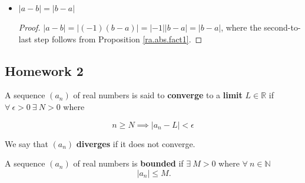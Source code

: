 \begin{itemize}
\begin{proof}
\begin{itemize}
\item \textbf{Case 1:} \(x \geq y\). Then \(|x - y| = x - y\). We know \(a < x < b \implies 0 < x - a < b - a\). 

\[
a < y \implies -a > -y \implies x - a > x -y \implies x - y < x - a < b - a
\]

\[
\implies \boxed{|x - y| < b - a}
\]


\item \textbf{Case 2:} \(x < y\). Then \(|x - y| = y - x\). We know \(a < y < b \implies 0 < y - a < b - a\).

\[
a < x \implies -a > -x \implies y - a > y - x \implies y - x < y - a < b - a
\]

\[
\implies \boxed{|x - y| < b - a}
\]

\end{itemize}

\end{proof}

\item \begin{proposition}\label{ra.abs.fact.a} \(|a - b| = |b - a|\) \end{proposition}

\begin{proof} \(|a - b| = |(-1)(b - a)| = |-1||b-a| = |b - a|\), where the second-to-last step follows from Proposition \ref{ra.abs.fact1}.

\end{proof}

\end{itemize}

\subsection{Homework 2}

\begin{definition}  A sequence \((a_n)\) of real numbers is said to \textbf{converge} to a \textbf{limit} \(L \in \mathbb{R}\) if \(\forall \ \epsilon > 0 \ \exists \ N > 0 \) where

\[
n \geq N \implies |a_n - L| < \epsilon
\]

We say that \((a_n)\) \textbf{diverges} if it does not converge.

\end{definition}

\begin{definition} A sequence \((a_n)\) of real numbers is \textbf{bounded} if \(\exists \ M > 0\) where \(\forall \ n \in \mathbb{N}\) \[\ |a_n| \leq M .\]

\end{definition}

